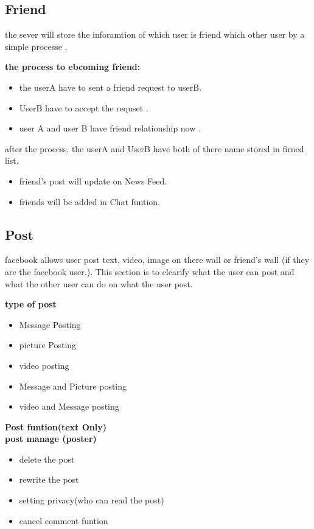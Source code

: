 \subsection{Friend}
the sever will store the inforamtion of which user is friend which other user by
a simple processe .

\textbf{the process to ebcoming friend:}
\begin{itemize}
\item the userA have to sent a friend request to userB.
\item UserB have to accept the requset .
\item user A and user B have friend relationship now .
\end{itemize}


after the process, the userA and UserB have both of there name stored in firned
list.
\begin{itemize}
\textbf{Funtion after become friend}
\item friend's post will update on News Feed.
\item friends will be added in Chat funtion.
\end{itemize}

\subsection{Post}
facebook allows user post text, video, image on there wall or friend's wall (if
they are the facebook user.). This section is to clearify what the user can post
and what the other user can do on what the user post.


\textbf{type of post}
\begin{itemize}
\item Message Posting 
\item picture Posting
\item video posting
\item Message and Picture posting
\item video and Message posting
\end{itemize}

\textbf{Post funtion(text Only)}\\
\textbf{post manage (poster)}
\begin{itemize}
\item delete the post
\item rewrite the post
\item setting privacy(who can read the post)
\item cancel comment funtion
\end{itemize}


